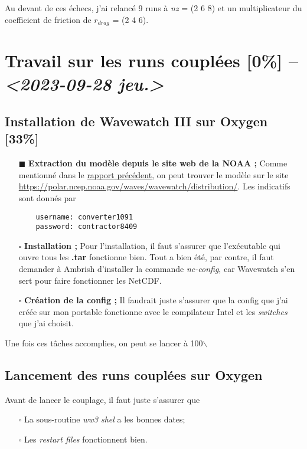 \documentclass[10pt]{article}
\numberwithin{equation}{section}
\renewcommand{\boxtimes}{\blacksquare}
\begin{document}
Au devant de ces échecs, j'ai relancé 9 runs à \emph{nz} = (2 6 8) et un multiplicateur du coefficient de friction de \(r_{drag}\) = (2 4 6).

\section{Travail sur les runs couplées [0\%] -- \textit{<2023-09-28 jeu.>}}
\label{sec:org095174b}

\subsection{Installation de Wavewatch III sur Oxygen [33\%]}
\label{sec:orgea70613}
\begin{itemize}
\item[{$\boxtimes$}] \textbf{Extraction du modèle depuis le site web de la NOAA ;}
Comme mentionné dans le \href{rapport-2023-09-22.pdf}{rapport précédent}, on peut trouver le modèle sur le site \url{https://polar.ncep.noaa.gov/waves/wavewatch/distribution/}.
Les indicatifs sont donnés par
\begin{verbatim}
    username: converter1091
    password: contractor8409
\end{verbatim}
\item[{$\square$}] \textbf{Installation ;}
Pour l'installation, il faut s'assurer que l'exécutable qui ouvre tous les \textbf{.tar} fonctionne bien.
Tout a bien été, par contre, il faut demander à Ambrish d'installer la commande \emph{nc-config}, car Wavewatch s'en sert pour faire fonctionner les NetCDF.
\item[{$\square$}] \textbf{Création de la config ;}
Il faudrait juste s'assurer que la config que j'ai créée sur mon portable fonctionne avec le compilateur Intel et les \emph{switches} que j'ai choisit.
\end{itemize}

Une fois ces tâches accomplies, on peut se lancer à 100$\backslash$%

\subsection{Lancement des runs couplées sur Oxygen}
\label{sec:orgc1b638b}
Avant de lancer le couplage, il faut juste s'assurer que
\begin{itemize}
\item[{$\square$}] La sous-routine \emph{ww3 shel} a les bonnes dates;
\item[{$\square$}] Les \emph{restart files} fonctionnent bien.
\end{itemize}
\end{document}

